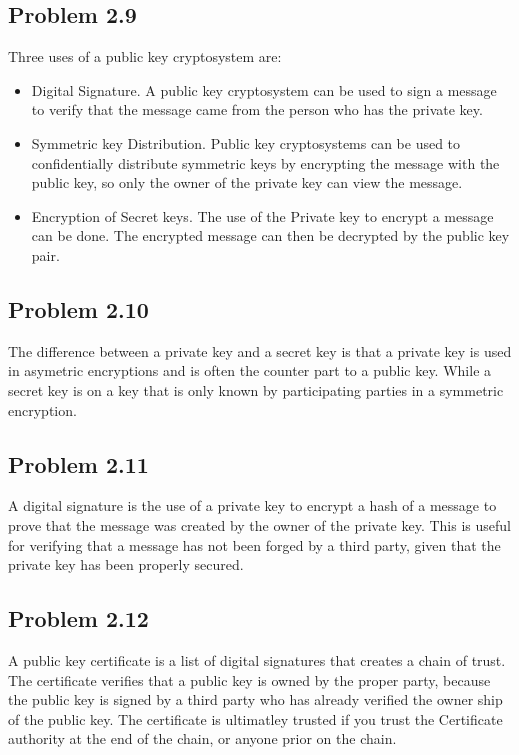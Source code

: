 \documentclass[12pt]{article}
\begin{document}
\subsection{Problem  2.9 \cite[p.~68]{stallings}}
Three uses of a public key cryptosystem are:
\begin{itemize}
\item Digital Signature. A public key cryptosystem can be used to sign a message to verify that the message came from the person who has the private key. 
\item Symmetric key Distribution. Public key cryptosystems can be used to confidentially distribute symmetric keys by encrypting the message with the public key, so only the owner of the private key can view the message.
\item Encryption of Secret keys. The use of the Private key to encrypt a message can be done. The encrypted message can then be decrypted by the public key pair.  
\end{itemize}

\subsection{Problem  2.10 \cite[p.~68]{stallings}}
The difference between a private key and a secret key is that a private key is used  in asymetric encryptions and is often the counter part to a public key. While a secret key is on a key that is only known by participating parties in a symmetric encryption. 

\subsection{Problem  2.11 \cite[p.~68]{stallings}}
A digital signature is the use of a private key to encrypt  a hash of a message to prove that the message was created by the owner of the private key. This is useful for verifying that a message has not been forged by a third party, given that the private key has been properly secured. 

\subsection{Problem  2.12 \cite[p.~68]{stallings}}
A public key certificate is a list of digital signatures that creates a chain of trust. The certificate verifies that a public key is owned by the proper party, because the public key is signed by a third party who has already verified the owner ship of the public key. The certificate is ultimatley trusted if you trust the Certificate authority at the end of the chain, or anyone prior on the chain.
\end{document}
